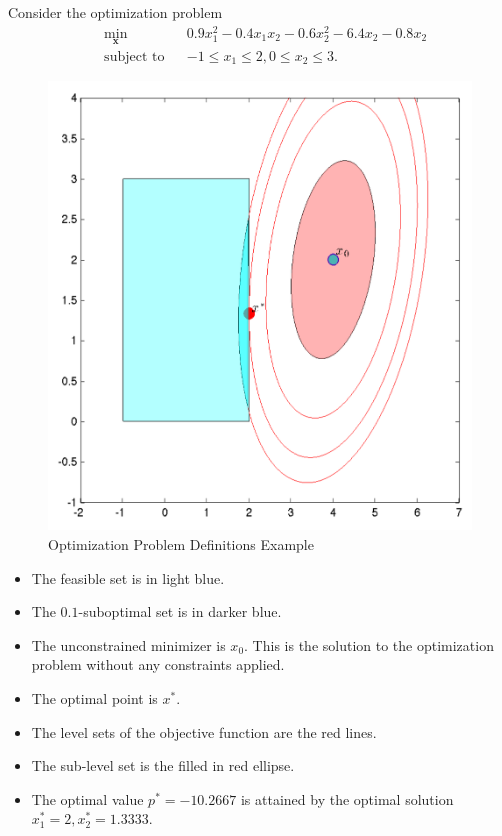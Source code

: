 \documentclass[12pt]{article}
\begin{document}
\begin{example}
Consider the optimization problem
\begin{equation*}
\begin{aligned}& \underset{\mathbf{x}}{\min}& & 0.9x_1^2-0.4x_1x_2-0.6x_2^2-6.4x_2-0.8x_2 \\& \text{subject to}& & -1\leqslant x_1\leqslant 2, 0\leqslant x_2\leqslant 3.\end{aligned}\end{equation*}
\begin{figure}[h!]\begin{center}\includegraphics[scale=0.3]{figures/optexamplebasic}\caption{Optimization Problem Definitions Example}\end{center}\end{figure}
\end{example}
\begin{itemize}
\item The feasible set is in light blue.
\item The $0.1$-suboptimal set is in darker blue.
\item The unconstrained minimizer is $x_0$. This is the solution to the optimization problem without any constraints applied.
\item The optimal point is $x^*$.
\item The level sets of the objective function are the red lines.
\item The sub-level set is the filled in red ellipse.
\item The optimal value $p^*=-10.2667$ is attained by the optimal solution $x_1^*=2, x_2^*=1.3333$.
\end{itemize}
\end{document}
